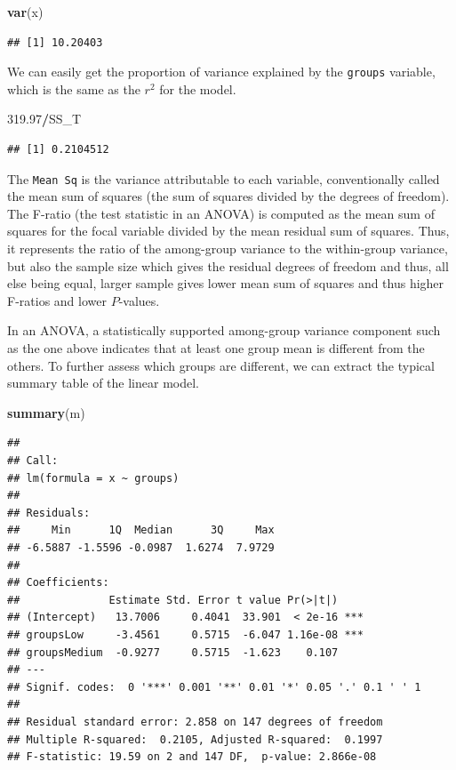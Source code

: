 \documentclass[
]{article}
\newenvironment{Shaded}{\begin{snugshade}}{\end{snugshade}}
\newcommand{\FloatTok}[1]{\textcolor[rgb]{0.00,0.00,0.81}{#1}}
\newcommand{\FunctionTok}[1]{\textcolor[rgb]{0.13,0.29,0.53}{\textbf{#1}}}
\newcommand{\NormalTok}[1]{#1}
\newcommand{\SpecialCharTok}[1]{\textcolor[rgb]{0.81,0.36,0.00}{\textbf{#1}}}
\begin{document}
\begin{Shaded}
\begin{Highlighting}[]
\FunctionTok{var}\NormalTok{(x)}
\end{Highlighting}
\end{Shaded}

\begin{verbatim}
## [1] 10.20403
\end{verbatim}

We can easily get the proportion of variance explained by the
\texttt{groups} variable, which is the same as the \(r^2\) for the
model.

\begin{Shaded}
\begin{Highlighting}[]
\FloatTok{319.97}\SpecialCharTok{/}\NormalTok{SS\_T}
\end{Highlighting}
\end{Shaded}

\begin{verbatim}
## [1] 0.2104512
\end{verbatim}

The \texttt{Mean\ Sq} is the variance attributable to each variable,
conventionally called the mean sum of squares (the sum of squares
divided by the degrees of freedom). The F-ratio (the test statistic in
an ANOVA) is computed as the mean sum of squares for the focal variable
divided by the mean residual sum of squares. Thus, it represents the
ratio of the among-group variance to the within-group variance, but also
the sample size which gives the residual degrees of freedom and thus,
all else being equal, larger sample gives lower mean sum of squares and
thus higher F-ratios and lower \(P\)-values.

In an ANOVA, a statistically supported among-group variance component
such as the one above indicates that at least one group mean is
different from the others. To further assess which groups are different,
we can extract the typical summary table of the linear model.

\begin{Shaded}
\begin{Highlighting}[]
\FunctionTok{summary}\NormalTok{(m)}
\end{Highlighting}
\end{Shaded}

\begin{verbatim}
## 
## Call:
## lm(formula = x ~ groups)
## 
## Residuals:
##     Min      1Q  Median      3Q     Max 
## -6.5887 -1.5596 -0.0987  1.6274  7.9729 
## 
## Coefficients:
##              Estimate Std. Error t value Pr(>|t|)    
## (Intercept)   13.7006     0.4041  33.901  < 2e-16 ***
## groupsLow     -3.4561     0.5715  -6.047 1.16e-08 ***
## groupsMedium  -0.9277     0.5715  -1.623    0.107    
## ---
## Signif. codes:  0 '***' 0.001 '**' 0.01 '*' 0.05 '.' 0.1 ' ' 1
## 
## Residual standard error: 2.858 on 147 degrees of freedom
## Multiple R-squared:  0.2105, Adjusted R-squared:  0.1997 
## F-statistic: 19.59 on 2 and 147 DF,  p-value: 2.866e-08
\end{verbatim}
\end{document}
